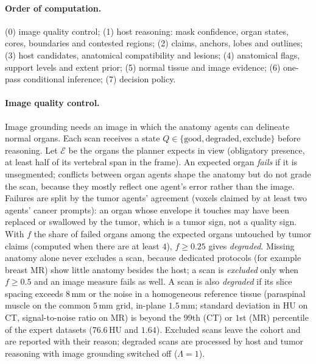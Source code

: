 \documentclass[fleqn,10pt]{olplainarticle}
\begin{document}
\paragraph{Order of computation.} (0) image quality control; (1) host reasoning: mask confidence, organ states, cores,
boundaries and contested regions; (2) claims, anchors, lobes and outlines; (3) host candidates, anatomical compatibility
and lesions; (4) anatomical flags, support levels and extent prior; (5) normal tissue and image evidence; (6) one-pass
conditional inference; (7) decision policy.

\paragraph{Image quality control.}
\label{sec:qc_details}
Image grounding needs an image in which the anatomy agents can delineate normal organs. Each scan receives a state
$Q\in\{\text{good},\text{degraded},\text{exclude}\}$ before reasoning. Let $\mathcal{E}$ be the organs the planner expects in
view (obligatory presence, at least half of its vertebral span in the frame). An expected organ \emph{fails} if it is
unsegmented; conflicts between organ agents shape the anatomy but do not grade the scan, because they mostly
reflect one agent's error rather than the image. Failures are split by the tumor agents' agreement (voxels claimed by at
least two agents' cancer prompts): an organ whose envelope it touches may have been replaced or swallowed by the tumor,
which is a tumor sign, not a quality sign. With $f$ the share of failed organs among the
expected organs untouched by tumor claims (computed when there are at least $4$), $f\ge0.25$ gives \emph{degraded}. Missing
anatomy alone never excludes a scan, because dedicated protocols (for example breast MR) show little anatomy besides the
host; a scan is \emph{excluded} only when $f\ge0.5$ and an image measure fails as well. A scan is also \emph{degraded} if its slice spacing exceeds $8$\,mm or the noise in a
homogeneous reference tissue (paraspinal muscle on the common $5$\,mm grid, in-plane $1.5$\,mm; standard deviation in HU on
CT, signal-to-noise ratio on MR) is beyond the $99$th (CT) or $1$st (MR) percentile of the expert datasets
($76.6$\,HU and $1.64$). Excluded scans leave the cohort and are reported with their reason; degraded scans
are processed by host and tumor reasoning with image grounding switched off ($\Lambda=1$).
\end{document}
